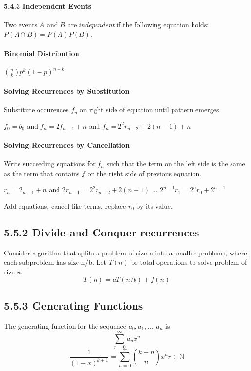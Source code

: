 \documentclass[10pt,twocolumn]{article}
\begin{document}
	\paragraph*{5.4.3 Independent Events}
	Two events $A$ and $B$ are \emph{independent} if the following
        equation holds: $P(A \cap B)=P(A)P(B)$.
	
	\paragraph*{Binomial Distribution}
	$\binom{n}{k}p^k(1-p)^{n-k}$

	\paragraph*{Solving Recurrences by Substitution}
	Substitute occurences $f_n$ on right side of equation until pattern emerges.
	\begin{flushleft}$f_0=b_0$ and $f_n=2f_{n-1}+n$ and $f_n=2^2r_{n-2}+2(n-1)+n$\end{flushleft}
	
	\paragraph*{Solving Recurrences by Cancellation}
	Write succeeding equations for $f_n$ such that the term on the
        left side is the same as the term that contains $f$ on the
        right side of previous equation.
        \begin{flushleft}$r_n=2_{n-1}+n$ and
          $2r_{n-1}=2^2r_{n-2}+2(n-1)$
          $\ldots$ $2^{n-1}r_1=2^nr_0+2^{n-1}$
        \end{flushleft}
	Add equations, cancel like terms, replace $r_0$ by its value.
	
	\subsection*{5.5.2 Divide-and-Conquer recurrences}
	Consider algorithm that splits a problem of size n into a smaller problems, where each subproblem has size n/b.  Let $T(n)$ be total operations to solve problem of size $n$.
		\[T(n)=aT(n/b)+f(n)\]
	
	\subsection*{5.5.3 Generating Functions}
	The generating function for the sequence $a_0, a_1, \ldots, a_n$ is
		\[\sum_{n=0}^\infty a_nx^n\]
		\[\frac{1}{(1-x)^{k+1}}=\sum_{n=0}^\infty \binom{k+n}{n}x^n r \in \mathbb{N}\]
\end{document}
